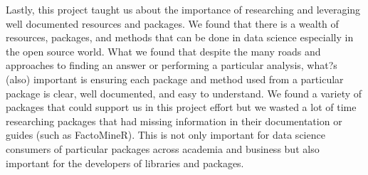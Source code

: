 \documentclass{article}
\begin{document}
Lastly, this project taught us about the importance of researching and leveraging well documented resources and packages.  We found that there is a wealth of resources, packages, and methods that can be done in data science especially in the open source world.  What we found that despite the many roads and approaches to finding an answer or performing a particular analysis, what?s (also) important is ensuring each package and method used from a particular package is clear, well documented, and easy to understand.  We found a variety of packages that could support us in this project effort but we wasted a lot of time researching packages that had missing information in their documentation or guides (such as FactoMineR).  This is not only important for data science consumers of particular packages across academia and business but also important for the developers of libraries and packages.      
\end{document}
